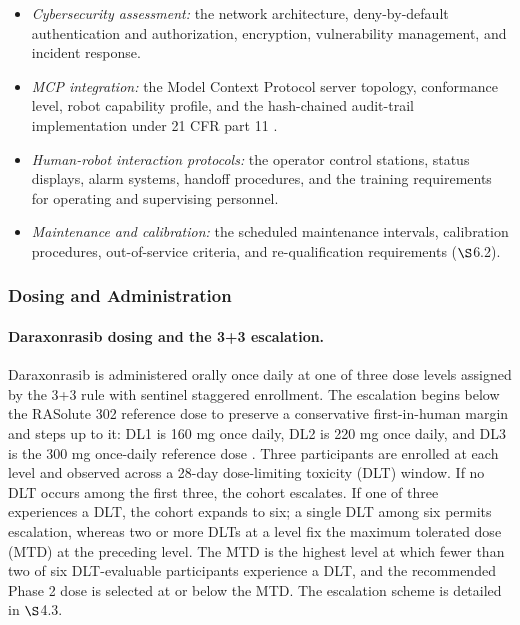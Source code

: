 \begin{itemize}[leftmargin=1.4em,itemsep=1pt,topsep=2pt]
software), force and torque limits, collision detection, workspace-boundary
enforcement, fail-safe behaviors, and the pre-procedure safety matrix.
\item[(viii)] \textit{Cybersecurity assessment:} the network architecture,
deny-by-default authentication and authorization, encryption, vulnerability
management, and incident response.
\item[(ix)] \textit{MCP integration:} the Model Context Protocol server topology,
conformance level, robot capability profile, and the hash-chained audit-trail
implementation under 21 CFR part 11 \cite{ecfr2026part11}.
\item[(x)] \textit{Human-robot interaction protocols:} the operator control
stations, status displays, alarm systems, handoff procedures, and the training
requirements for operating and supervising personnel.
\item[(xi)] \textit{Maintenance and calibration:} the scheduled maintenance
intervals, calibration procedures, out-of-service criteria, and re-qualification
requirements ($\S$6.2).
\end{itemize}

\subsubsection{Dosing and Administration}

\paragraph{Daraxonrasib dosing and the 3+3 escalation.}
Daraxonrasib is administered orally once daily at one of three dose levels assigned
by the 3+3 rule with sentinel staggered enrollment. The escalation begins below the
RASolute 302 reference dose to preserve a conservative first-in-human margin and
steps up to it: DL1 is 160 mg once daily, DL2 is 220 mg once daily, and DL3 is the
300 mg once-daily reference dose \cite{rasolute302}. Three participants are enrolled
at each level and observed across a 28-day dose-limiting toxicity (DLT) window. If
no DLT occurs among the first three, the cohort escalates. If one of three
experiences a DLT, the cohort expands to six; a single DLT among six permits
escalation, whereas two or more DLTs at a level fix the maximum tolerated dose
(MTD) at the preceding level. The MTD is the highest level at which fewer than two
of six DLT-evaluable participants experience a DLT, and the recommended Phase 2
dose is selected at or below the MTD. The escalation scheme is detailed in $\S$4.3.

